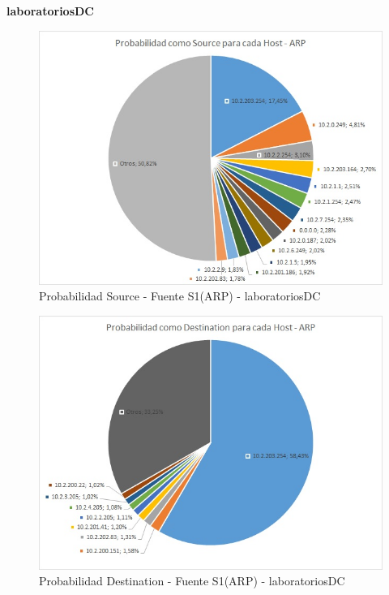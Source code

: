 \textbf{laboratoriosDC}
\begin{figure}[h!]
\centering
\includegraphics[scale=0.6]{./img/proba_src_laboDC.jpg}
\caption{Probabilidad Source - Fuente S1(ARP) - laboratoriosDC}
\end{figure}

\begin{figure}[h!]
\centering
\includegraphics[scale=0.6]{./img/proba_dst_laboDC.jpg}
\caption{Probabilidad Destination - Fuente S1(ARP) - laboratoriosDC}
\end{figure}
\newpage



